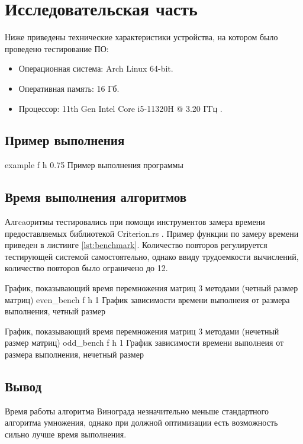 \chapter{Исследовательская часть}
Ниже приведены технические характеристики устройства, на котором было проведено тестирование ПО:

\begin{itemize}
    \item Операционная система: Arch Linux \cite{arch} 64-bit.
    \item Оперативная память: 16 Гб.
    \item Процессор: 11th Gen Intel Core i5-11320H @ 3.20 ГГц \cite{i5}.
\end{itemize}

\section{Пример выполнения}
{example} %
{f} %
{h} %
{0.75\textwidth} %
{Пример выполнения программы} %
\clearpage

\section{Время выполнения алгоритмов}
Алгcaоритмы тестировались при помощи инструментов замера времени предоставляемых библиотекой Criterion.rs \cite{Criterion}.
Пример функции по замеру времени приведен в листинге \ref{lst:benchmark}.
Количество повторов регулируется тестирующей системой самостоятельно, однако ввиду трудоемкости вычислений, количество повторов было ограничено до 12.


\newpage
График, показывающий время перемножения матриц 3 методами (четный размер матриц)\newline
{}
{even_bench} %
{f} %
{h} %
{1\textwidth} %
{График зависимости времени выполнеия от размера выполнения, четный размер} %
\newpage

График, показывающий время перемножения матриц 3 методами (нечетный размер матриц)\newline
{}
{odd_bench} %
{f} %
{h} %
{1\textwidth} %
{График зависимости времени выполнеия от размера выполнения, нечетный размер} %

\section*{Вывод}

Время работы алгоритма Винограда незначительно меньше стандартного алгоритма умножения, однако при должной оптимизации есть возможность сильно лучше время выполнения.